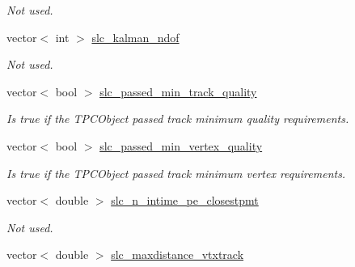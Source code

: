 \begin{DoxyCompactItemize}
\begin{DoxyCompactList}\small\item\em Not used. \end{DoxyCompactList}\item 
\hypertarget{classUBXSecEvent_ac4a8b79e4a4b02254ede89b475f3ca5c}{vector$<$ int $>$ \hyperlink{classUBXSecEvent_ac4a8b79e4a4b02254ede89b475f3ca5c}{slc\-\_\-kalman\-\_\-ndof}}\label{classUBXSecEvent_ac4a8b79e4a4b02254ede89b475f3ca5c}

\begin{DoxyCompactList}\small\item\em Not used. \end{DoxyCompactList}\item 
\hypertarget{classUBXSecEvent_aab3be8887f062f848104113097b27ad5}{vector$<$ bool $>$ \hyperlink{classUBXSecEvent_aab3be8887f062f848104113097b27ad5}{slc\-\_\-passed\-\_\-min\-\_\-track\-\_\-quality}}\label{classUBXSecEvent_aab3be8887f062f848104113097b27ad5}

\begin{DoxyCompactList}\small\item\em Is true if the T\-P\-C\-Object passed track minimum quality requirements. \end{DoxyCompactList}\item 
\hypertarget{classUBXSecEvent_af2bdc55d1c56cea1c4e3104e262f029c}{vector$<$ bool $>$ \hyperlink{classUBXSecEvent_af2bdc55d1c56cea1c4e3104e262f029c}{slc\-\_\-passed\-\_\-min\-\_\-vertex\-\_\-quality}}\label{classUBXSecEvent_af2bdc55d1c56cea1c4e3104e262f029c}

\begin{DoxyCompactList}\small\item\em Is true if the T\-P\-C\-Object passed track minimum vertex requirements. \end{DoxyCompactList}\item 
\hypertarget{classUBXSecEvent_a8234ab4e219c1355370b5f141ad10211}{vector$<$ double $>$ \hyperlink{classUBXSecEvent_a8234ab4e219c1355370b5f141ad10211}{slc\-\_\-n\-\_\-intime\-\_\-pe\-\_\-closestpmt}}\label{classUBXSecEvent_a8234ab4e219c1355370b5f141ad10211}

\begin{DoxyCompactList}\small\item\em Not used. \end{DoxyCompactList}\item 
\hypertarget{classUBXSecEvent_afbcefec1936192c7a46b3414d7f3067d}{vector$<$ double $>$ \hyperlink{classUBXSecEvent_afbcefec1936192c7a46b3414d7f3067d}{slc\-\_\-maxdistance\-\_\-vtxtrack}}\label{classUBXSecEvent_afbcefec1936192c7a46b3414d7f3067d}


\end{DoxyCompactItemize}
